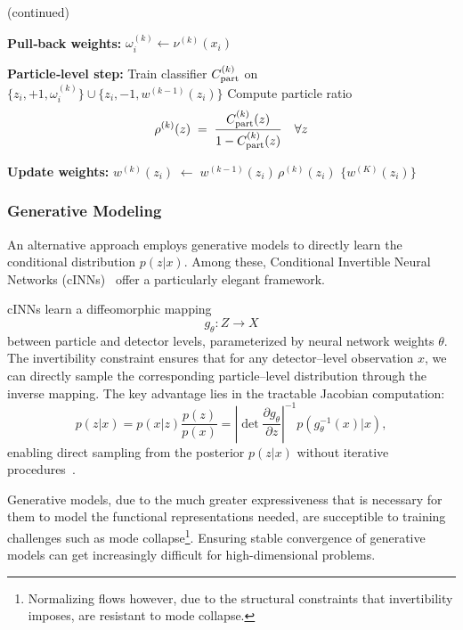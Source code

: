 \begin{algorithm}\ContinuedFloat
  \caption[]{(continued)} %
  \begin{algorithmic}[1]
    
    \State \textbf{Pull‐back weights:}
      \State $\omega_i^{(k)} \leftarrow \nu^{(k)}(x_i)$
    \EndFor
    
    \State \textbf{Particle‐level step:}
    \State Train classifier $C_{\rm part}^{(k)}$ on
      $\{z_i,+1,\omega_i^{(k)}\}\cup\{z_i,-1,w^{(k-1)}(z_i)\}$
    \State Compute particle ratio
      \[
        \rho^{(k)}(z)\;=\;\frac{C_{\rm part}^{(k)}(z)}{1 - C_{\rm part}^{(k)}(z)}
        \quad\forall z
      \]
    
    \State \textbf{Update weights:}
      \State $w^{(k)}(z_i)\;\leftarrow\;w^{(k-1)}(z_i)\,\rho^{(k)}(z_i)$
    \EndFor
  \EndFor
  \State \Return $\{w^{(K)}(z_i)\}$
  \end{algorithmic}
\end{algorithm}
        \subsubsection{Generative Modeling}
            An alternative approach employs generative models to directly learn the conditional distribution \(p(z|x)\).
            Among these, Conditional Invertible Neural Networks (cINNs)~\cite{AnanthaPadmanabha2021SolvingNetworks} offer a particularly elegant framework.
            
            cINNs learn a diffeomorphic mapping \[g_\theta: {Z} \to {X}\] between particle and detector levels, parameterized by neural network weights \(\theta\).
            The invertibility constraint ensures that for any detector--level observation \(x\), we can directly sample the corresponding particle--level distribution through the inverse mapping.
            The key advantage lies in the tractable Jacobian computation:
            \begin{equation}
                p(z|x) = p(x|z) \frac{p(z)}{p(x)} = \left|\det \frac{\partial g_\theta}{\partial z}\right|^{-1} p(g_\theta^{-1}(x)|x),
            \end{equation}
            enabling direct sampling from the posterior \(p(z|x)\) without iterative procedures~\cite{Bellagente2020InvertibleAgain}.

            Generative models, due to the much greater expressiveness that is necessary for them to model the functional representations needed, are succeptible to training challenges such as mode collapse\footnote{Normalizing flows however, due to the structural constraints that invertibility imposes, are resistant to mode collapse.}.
            Ensuring stable convergence of generative models can get increasingly difficult for high-dimensional problems.
            
